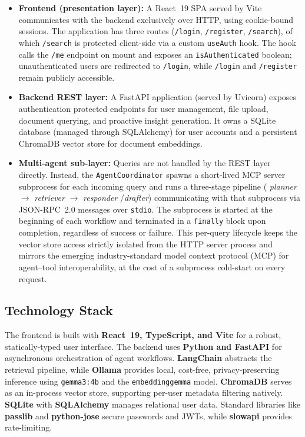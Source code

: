 \documentclass[11pt,a4paper]{article}
\begin{document}
\begin{itemize}
    \item \textbf{Frontend (presentation layer):} A React~19 SPA served by Vite communicates
          with the backend exclusively over HTTP, using cookie-bound sessions.  The application
          has three routes (\texttt{/login}, \texttt{/register}, \texttt{/search}), of which
          \texttt{/search} is protected client-side via a custom \texttt{useAuth} hook.  The hook
          calls the \texttt{/me} endpoint on mount and exposes an \texttt{isAuthenticated} boolean;
          unauthenticated users are redirected to \texttt{/login}, while \texttt{/login} and
          \texttt{/register} remain publicly accessible.

    \item \textbf{Backend REST layer:} A FastAPI application (served by Uvicorn) exposes authentication protected
          endpoints for user management, file upload, document querying, and proactive insight
          generation.  It owns a SQLite database (managed through SQLAlchemy) for user accounts and
          a persistent ChromaDB vector store for document embeddings.

    \item \textbf{Multi-agent sub-layer:} Queries are not handled by the REST layer directly.
          Instead, the \texttt{AgentCoordinator} spawns a short-lived MCP server subprocess
          for each incoming query and runs a three-stage pipeline ( \textit{planner}
          $\rightarrow$ \textit{retriever} $\rightarrow$ \textit{responder} /\textit{drafter}) communicating with that subprocess via JSON-RPC~2.0 messages
          over \texttt{stdio}.  The subprocess is started at the beginning of each workflow
          and terminated in a \texttt{finally} block upon completion, regardless of success
          or failure.  This per-query lifecycle keeps the vector store access strictly
          isolated from the HTTP server process and mirrors the emerging industry-standard
          model context protocol (MCP) for agent--tool interoperability, at the cost of a
          subprocess cold-start on every request.
\end{itemize}

\subsection{Technology Stack}

The frontend is built with \textbf{React~19, TypeScript, and Vite} for a robust, statically-typed user interface. The backend uses \textbf{Python and FastAPI} for asynchronous orchestration of agent workflows. \textbf{LangChain} abstracts the retrieval pipeline, while \textbf{Ollama} provides local, cost-free, privacy-preserving inference using \texttt{gemma3:4b} and the \texttt{embeddinggemma} model. \textbf{ChromaDB} serves as an in-process vector store, supporting per-user metadata filtering natively. \textbf{SQLite} with \textbf{SQLAlchemy} manages relational user data. Standard libraries like \textbf{passlib} and \textbf{python-jose} secure passwords and JWTs, while \textbf{slowapi} provides rate-limiting.
\end{document}
